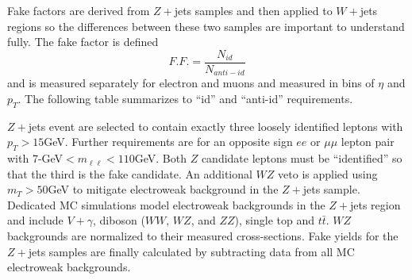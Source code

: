 Fake factors are derived from $Z+$jets samples and then applied to $W+$jets regions so the differences between these two samples are important to understand fully. The fake factor is defined 
\begin{equation}
F.F. = \frac{N_{id}}{N_{anti-id}}
\end{equation}
and is measured separately for electron and muons and measured in bins of $\eta$ and $p_T$. The following table summarizes to ``id'' and ``anti-id'' requirements. 

\begin{table}[tb]
\caption{Requirements for ``identified'' and ``anti-identified'' electrons and muons.}
\label{tab:idantiid}
\end{table}
$Z+$jets event are selected to contain exactly three loosely identified leptons with $p_T>15$GeV. Further requirements are for an opposite sign $ee$ or $\mu\mu$ lepton pair with 7-GeV$< m_{\ell\ell} < 110$GeV. Both $Z$ candidate leptons must be ``identified'' so that the third is the fake candidate. An additional $WZ$ veto is applied using $m_T>50$GeV to mitigate electroweak background in the $Z+$jets sample. Dedicated MC simulations model electroweak backgrounds in the $Z+$jets region and include $V+\gamma$, diboson ($WW$, $WZ$, and $ZZ$), single top and $t\bar{t}$. $WZ$ backgrounds are normalized to their measured cross-sections. Fake yields for the $Z+$jets samples are finally calculated by subtracting data from all MC electroweak backgrounds. 

